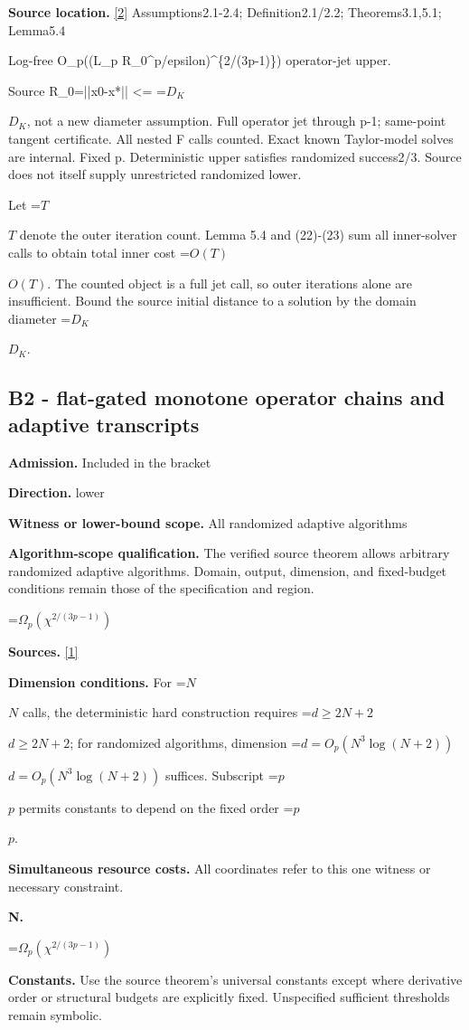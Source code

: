 \documentclass[10pt,a4paper]{article}
\newcommand{\AtlasMath}[1]{\par\begingroup\centering\setbox0=\hbox{$\displaystyle #1$}\ifdim\wd0>1.4\linewidth\typeout{ATLAS WIDE FORMULA: \the\wd0}\fi\ifdim\wd0>\linewidth\resizebox{\linewidth}{!}{\box0}\else\box0\fi\par\endgroup}
\newcommand{\AtlasInlineMath}[1]{\begingroup\setbox0=\hbox{$#1$}\ifdim\wd0>.4\linewidth\endgroup\AtlasMath{#1}\else\endgroup$#1$\fi}
\begin{document}
\textbf{Source location.} \href{https://arxiv.org/pdf/2609.23557v1}{[2]} Assumptions2.1-2.4; Definition2.1/2.2; Theorems3.1,5.1; Lemma5.4

Log-free O\_p((L\_p R\_0\textasciicircum{}p/epsilon)\textasciicircum{}\{2/(3p-1)\}) operator-jet upper.

Source R\_0=||x0-x*|| <= \AtlasInlineMath{D_K}, not a new diameter assumption. Full operator jet through p-1; same-point tangent certificate. All nested F calls counted. Exact known Taylor-model solves are internal. Fixed p. Deterministic upper satisfies randomized success2/3. Source does not itself supply unrestricted randomized lower.

Let \AtlasInlineMath{T} denote the outer iteration count. Lemma 5.4 and (22)-(23) sum all inner-solver calls to obtain total inner cost \AtlasInlineMath{O(T)}. The counted object is a full jet call, so outer iterations alone are insufficient. Bound the source initial distance to a solution by the domain diameter \AtlasInlineMath{D_K}.

\subsection{B2 - flat-gated monotone operator chains and adaptive transcripts}
\textbf{Admission.} Included in the bracket

\textbf{Direction.} lower

\textbf{Witness or lower-bound scope.} All randomized adaptive algorithms

\textbf{Algorithm-scope qualification.} The verified source theorem allows arbitrary randomized adaptive algorithms. Domain, output, dimension, and fixed-budget conditions remain those of the specification and region.

\AtlasMath{\Omega_p(\chi^{2/(3p-1)})}
\textbf{Sources.} \href{https://arxiv.org/pdf/2609.13462v2}{[1]}

\textbf{Dimension conditions.} For \AtlasInlineMath{N} calls, the deterministic hard construction requires \AtlasInlineMath{d\ge2N+2}; for randomized algorithms, dimension \AtlasInlineMath{d=O_p(N^3\log(N+2))} suffices. Subscript \AtlasInlineMath{p} permits constants to depend on the fixed order \AtlasInlineMath{p}.

\textbf{Simultaneous resource costs.} All coordinates refer to this one witness or necessary constraint.

\textbf{N.}

\AtlasMath{\Omega_p(\chi^{2/(3p-1)})}
\textbf{Constants.} Use the source theorem’s universal constants except where derivative order or structural budgets are explicitly fixed. Unspecified sufficient thresholds remain symbolic.
\end{document}

